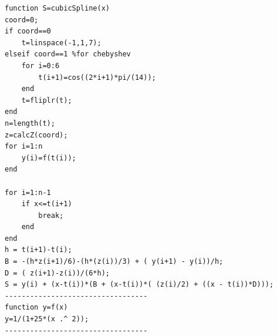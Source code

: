 \begin{enumerate}[1.]
\begin{verbatim}
function S=cubicSpline(x)
coord=0;
if coord==0
    t=linspace(-1,1,7);
elseif coord==1 %for chebyshev
    for i=0:6
        t(i+1)=cos((2*i+1)*pi/(14));
    end
    t=fliplr(t);
end
n=length(t);
z=calcZ(coord);
for i=1:n
    y(i)=f(t(i));
end

for i=1:n-1
    if x<=t(i+1)
        break;
    end
end
h = t(i+1)-t(i);
B = -(h*z(i+1)/6)-(h*(z(i))/3) + ( y(i+1) - y(i))/h;
D = ( z(i+1)-z(i))/(6*h);
S = y(i) + (x-t(i))*(B + (x-t(i))*( (z(i)/2) + ((x - t(i))*D)));
----------------------------------
function y=f(x)
y=1/(1+25*(x .^ 2));
----------------------------------

\end{verbatim}

\end{enumerate}

